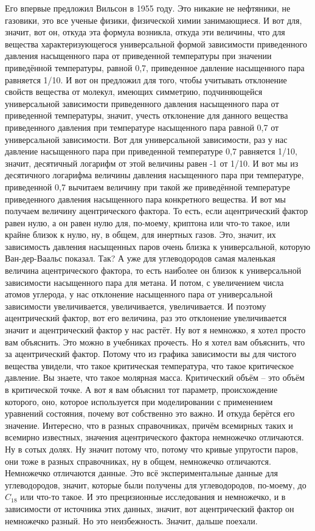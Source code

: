 \documentclass[main.tex]{subfiles}
\begin{document}
Его впервые предложил Вильсон в 1955 году.
Это никакие не нефтяники, не газовики, это все ученые физики, физической химии занимающиеся.
И вот для, значит, вот он, откуда эта формула возникла, откуда эти величины, что для вещества характеризующегося универсальной формой зависимости приведенного давления насыщенного пара от приведенной температуры при значении приведённой температуры, равной 0,7, приведенное давление насыщенного пара равняется 1/10.
И вот он предложил для того, чтобы учитывать отклонение свойств вещества от молекул, имеющих симметрию, подчиняющейся универсальной зависимости приведенного давления насыщенного пара от приведенной температуры, значит, учесть отклонение для данного вещества приведенного давления при температуре насыщенного пара равной 0,7 от универсальной зависимости.
Вот для универсальной зависимости, раз у нас давление насыщенного пара при приведенной температуре 0,7 равняется 1/10, значит, десятичный логарифм от этой величины равен -1 от
1/10.
И вот мы из десятичного логарифма величины давления насыщенного пара при температуре, приведенной 0,7 вычитаем величину при такой же приведённой температуре приведенного давления насыщенного пара конкретного вещества.
И вот мы получаем величину ацентрического фактора.
То есть, если ацентрический фактор равен нулю, а он равен нулю для, по-моему, криптона или что-то такое, или крайне близок к нулю, ну, в общем, для инертных газов.
Это, значит, их зависимость давления насыщенных паров очень близка к универсальной, которую Ван-дер-Ваальс показал.
Так?
А уже для углеводородов самая маленькая величина ацентрического фактора, то есть наиболее он близок к универсальной зависимости насыщенного пара для метана.
И потом, с увеличением числа атомов углерода, у нас отклонение насыщенного пара от универсальной зависимости увеличивается, увеличивается, увеличивается.
И поэтому ацентрический фактор, вот его величина, раз это отклонение увеличивается значит и ацентрический фактор у нас растёт.
Ну вот я немножко, я хотел просто вам объяснить.
Это можно в учебниках прочесть.
Но я хотел вам объяснить, что за ацентрический фактор.
Потому что из графика зависимости вы для чистого вещества увидели, что такое критическая температура, что такое критическое давление.
Вы знаете, что такое молярная масса.
Критический объём -- это объём в критической точке.
А вот я вам объяснил тот параметр, происхождение которого, оно, которое используется при моделировании с применением уравнений состояния, почему вот собственно это важно.
И откуда берётся его значение.
Интересно, что в разных справочниках, причём всемирных таких и всемирно известных, значения ацентрического фактора немножечко отличаются.
Ну в сотых долях.
Ну значит потому что, потому что кривые упругости паров, они тоже в разных справочниках, ну в общем, немножечко отличаются.
Немножечко отличаются данные.
Это всё экспериментальные данные для углеводородов, значит, которые были получены для углеводородов, по-моему, до $C_{18}$ или что-то такое.
И это прецизионные исследования и немножечко, и в зависимости от источника этих данных, значит, вот ацентрический фактор он немножечко разный.
Но это неизбежность.
Значит, дальше поехали.
\end{document}
